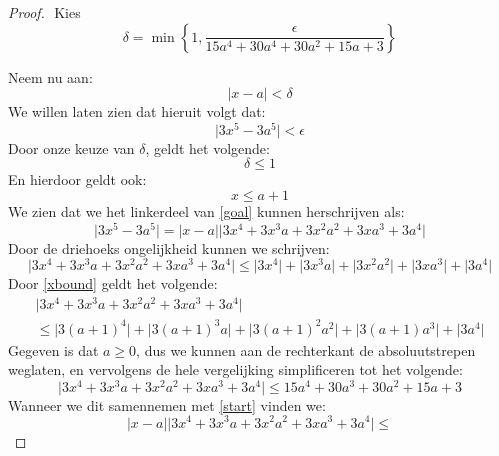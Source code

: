 \documentclass[12pt, dutch, a4paper]{article}
\theoremstyle{definition}
\begin{document}
\begin{proof} $ $ \newline
  Kies \[\delta = 
  \min{\left\{1,\frac{\epsilon}{15a^4 + 30a^4 + 30a^2 + 15a + 3}\right\}}\]

  Neem nu aan:
  \begin{equation} \label{start}
    \lvert x - a \rvert < \delta 
  \end{equation}
  We willen laten zien dat hieruit volgt dat:
  \begin{equation} \label{goal}
    \lvert 3x^5 - 3a^5 \rvert < \epsilon
  \end{equation}
  Door onze keuze van $\delta$, geldt het volgende:
  \begin{equation}
    \delta \leq 1 
  \end{equation}
  En hierdoor geldt ook:
  \begin{equation} \label{xbound}
    x \leq a + 1
  \end{equation}
  We zien dat we het linkerdeel van \cref{goal} kunnen herschrijven als:
  \begin{equation} \label{buitenhaken}
    \lvert 3x^5 - 3a^5 \rvert = 
    \lvert x - a \rvert \lvert 3x^4 + 3x^3a + 3x^2a^2 + 3xa^3 + 3a^4 \rvert 
  \end{equation}
  Door de driehoeks ongelijkheid kunnen we schrijven:
  \begin{equation}
    \lvert 3x^4 + 3x^3a + 3x^2a^2 + 3xa^3 + 3a^4 \rvert \leq
    \lvert 3x^4\rvert + \lvert3x^3a\rvert + \lvert3x^2a^2\rvert + 
    \lvert3xa^3\rvert + \lvert3a^4 \rvert
  \end{equation}
  Door \cref{xbound} geldt het volgende:
  \begin{multline}
    \lvert 3x^4 + 3x^3a + 3x^2a^2 + 3xa^3 + 3a^4 \rvert \\ \leq 
    \lvert 3(a + 1)^4\rvert + \lvert3(a + 1)^3a\rvert + \lvert3(a + 1)^2a^2\rvert + 
    \lvert3(a + 1)a^3\rvert + \lvert3a^4 \rvert
  \end{multline}
  Gegeven is dat $a \geq 0$, 
  dus we kunnen aan de rechterkant de absoluutstrepen weglaten, 
  en vervolgens de hele vergelijking simplificeren tot het volgende:
  \begin{equation}
    \lvert 3x^4 + 3x^3a + 3x^2a^2 + 3xa^3 + 3a^4 \rvert \leq
    15a^4 + 30a^3 + 30a^2 + 15a + 3
  \end{equation}
  Wanneer we dit samennemen met \cref{start} vinden we:
  \begin{equation}
    \lvert x - a \rvert 
    \lvert 3x^4 + 3x^3a + 3x^2a^2 + 3xa^3 + 3a^4 \rvert \leq

\end{equation}
\end{proof}
\end{document}
